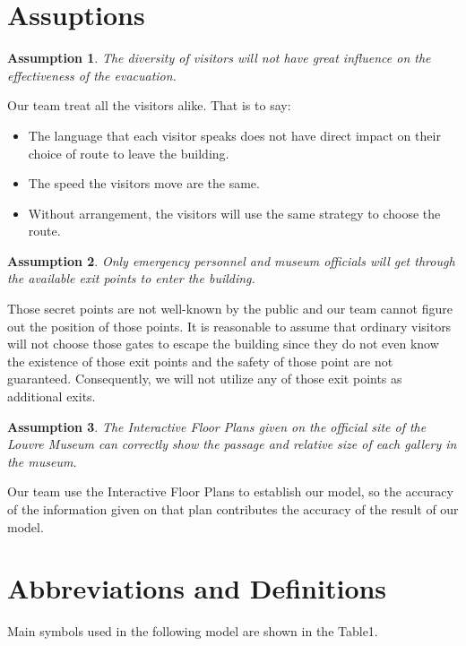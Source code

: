 \documentclass{mcmthesis}
\newtheorem{assumption}{Assumption}
\begin{document}
\section{Assuptions}
\begin{assumption}
    The diversity of visitors will not have great influence on the effectiveness of the evacuation.
    \end{assumption}
    Our team treat all the visitors alike. That is to say:
    \begin{itemize}
    \item The language that each visitor speaks does not have direct impact on their choice of route to leave the building. 
    \item The speed the visitors move are the same.
    \item Without arrangement, the visitors will use the same strategy to choose the route.
    \end{itemize}
    \begin{assumption}
    Only emergency personnel and museum officials will get through the available exit points to enter the building.
    \end{assumption}

    Those secret points are not well-known by the public and our team cannot figure out the position of those points. It is reasonable to assume that ordinary visitors will not choose those gates to escape the building since they do not even know the existence of those exit points and the safety of those point are not guaranteed. Consequently, we will not utilize any of those exit points as additional exits.
    \begin{assumption}
    The Interactive Floor Plans given on the official site of the Louvre Museum can correctly show the passage and relative size of each gallery in the museum.
    \end{assumption}
    Our team use the Interactive Floor Plans to establish our model, so the accuracy of the information given on that plan contributes the accuracy of the result of our model.
    

\section{Abbreviations and Definitions}
Main symbols used in the following model are shown in the Table1.
\renewcommand\arraystretch{1.4}
\end{document}
